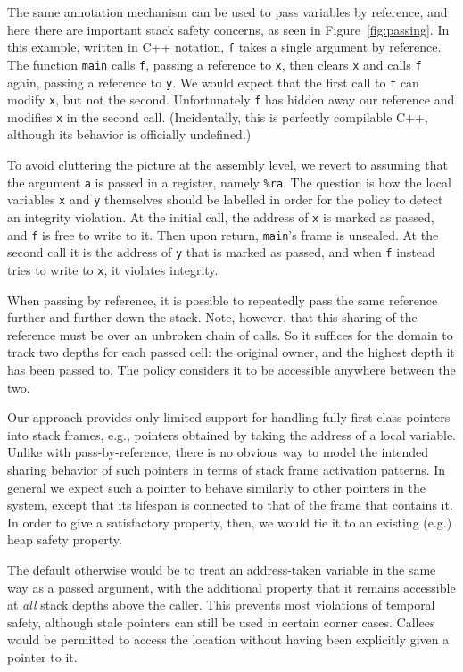 \documentclass[acmsmall,review,anonymous]{acmart}\settopmatter{printfolios=true,printccs=false,printacmref=false}
\begin{document}
{{The same annotation mechanism can be used to pass
variables by reference, and here there are important stack safety concerns,
as seen in Figure~\ref{fig:passing}. In this example, written in C++ notation,
{\tt f} takes a single argument by reference.  The function
{\tt main} calls {\tt f}, passing a reference to {\tt x}, then clears {\tt x} and calls
{\tt f} again, passing a reference to {\tt y}.
We would expect that the first call to {\tt f} can modify
{\tt x}, but not the second. Unfortunately {\tt f} has hidden away our reference and modifies
{\tt x} in the second call. (Incidentally, this is perfectly compilable C++,
although its behavior is officially undefined.)

To avoid cluttering the picture at the assembly level, we revert to assuming that the
argument {\tt a} is passed in a register, namely {\tt \%ra}.
The question is how the local variables {\tt x} and {\tt y} themselves
should be labelled in order for the policy to detect an integrity violation.
At the initial call, the address of {\tt x} is marked as passed, and {\tt f} is free to write to it. Then upon
return, {\tt main}'s frame is unsealed. At the second call it is the address of {\tt y} that is marked as passed,
and when {\tt f} instead tries to write to {\tt x}, it violates integrity.

When passing by reference, it is possible to repeatedly pass the same reference further
and further down the stack. Note, however, that this sharing of the reference must be over
an unbroken chain of calls. So it suffices for the domain to track two depths for each passed
cell: the original owner, and the highest depth it has been passed to. The policy considers
it to be accessible anywhere between the two.

Our approach provides only limited support for handling fully first-class pointers into
stack frames, e.g., pointers obtained by taking the address of a local variable.
Unlike with pass-by-reference, there is no obvious way to model the intended
sharing behavior of such pointers in terms of stack frame activation patterns.
In general we expect such a pointer to behave similarly to other pointers in
the system, except that its lifespan is connected to that of the frame that contains
it. In order to give a satisfactory property, then, we would tie it to an existing (e.g.)
heap safety property.

The default otherwise would be to treat an address-taken variable in the
same way as a passed argument, with the additional property
that it remains accessible at \emph{all} stack depths above the caller.
This prevents most violations of temporal safety, although stale pointers
can still be used in certain corner cases. Callees would be permitted
to access the location without having been explicitly given a pointer
to it.
}}
\end{document}

